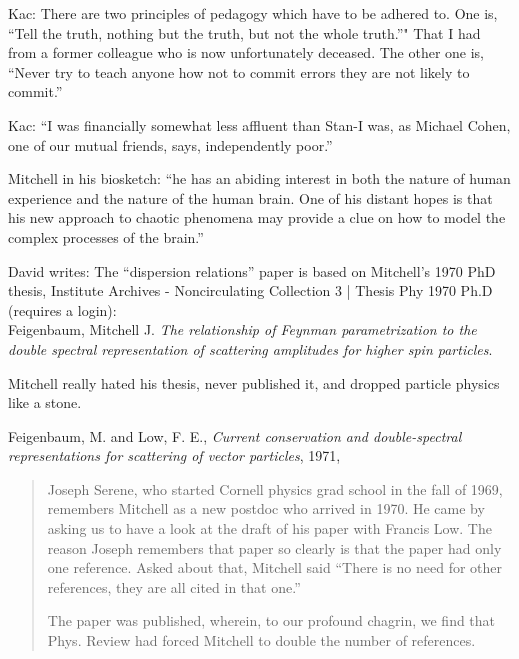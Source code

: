 \begin{description}
Kac: There are two principles of pedagogy which have to be adhered to.
One is, ``Tell the truth, nothing but the truth, but not the whole
truth.''" That I had from a former colleague who is now unfortunately
deceased. The other one is, ``Never try to teach anyone how not to commit
errors they are not likely to commit.''

Kac: ``I was financially somewhat less affluent than Stan-I was, as
Michael Cohen, one of our mutual friends, says, independently poor.''

Mitchell in his biosketch: ``he has an abiding interest in both the
nature of human experience and the nature of the human brain. One of his
distant hopes is that his new approach to chaotic phenomena may provide a
clue on how to model the complex processes of the brain.''

\medskip

David writes:
The ``dispersion relations'' paper is
based on Mitchell's 1970 PhD thesis,
Institute Archives - Noncirculating Collection 3 |
{Thesis Phy 1970 Ph.D}
(requires a login):
\\
Feigenbaum, Mitchell J.
{\em The relationship of Feynman parametrization to the double spectral
representation of scattering amplitudes for higher spin particles}.

Mitchell really hated his thesis, never published it, and dropped
particle physics like a stone.

{Feigenbaum, M. and Low, F. E.},
  {\em Current conservation and double-spectral representations for scattering of vector particles},
{1971},
\begin{quote}
Joseph Serene, who started Cornell physics grad school in the fall of 1969,
remembers Mitchell as a new postdoc who arrived in
1970. He came by asking us to have a look at the draft of his paper with
{Francis Low}.
The reason Joseph remembers that paper so clearly is that the paper had
only one reference. Asked about that, Mitchell said ``There is no need for
other references, they are all cited in that one.''

The paper was published, wherein, to our profound chagrin,
we find that Phys. Review had forced Mitchell to double the number of
references.
\end{quote}


\end{description}
